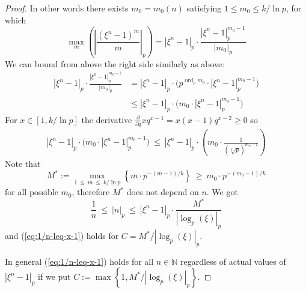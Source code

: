 \documentclass[10pt,a4paper]{amsart}
\def\N{{\mathbb N}}
\def\ln{\operatorname{ln}}
\def\ord{\operatorname{ord}}
\begin{document}
\begin{proof}
  In other words there exists $m_0 = m_0(n)$ satisfying $1 \leq m_0 \leq k/\ln p$, for which
  \begin{equation*} %
    \max_m \left( \left|\frac{(\xi^n - 1)^m}{m} \right|_p \right)
    = |\xi^n-1|_p \cdot \frac{\left| \xi^n-1 \right|_p^{m_0-1}}{|m_0|_p}
  \end{equation*}
  We can bound from above the right side similarly as above:
  \begin{align*}
    |\xi^n-1|_p \cdot \frac{\left| \xi^n-1 \right|_p^{m_0-1}}{|m_0|_p}
    &=  |\xi^n-1|_p \cdot \Big( p^{\ord_p m_0} \cdot \left| \xi^n-1 \right|_p^{m_0-1} \Big) \\
    &\leq |\xi^n-1|_p \cdot \Big( m_0 \cdot \left| \xi^n-1 \right|_p^{m_0-1} \Big)
  \end{align*}
  For $x \in [1, k/\ln p]$ the derivative $\frac{\partial}{\partial q} xq^{x-1} = x(x-1)q^{x-2} \geq 0$ so
  \begin{align*}
    |\xi^n-1|_p \cdot \Big( m_0 \cdot \left| \xi^n-1 \right|_p^{m_0-1} \Big)
    \ \leq \  |\xi^n-1|_p \cdot \left( m_0 \cdot \frac{1}{(\sqrt[k]{p})^{m_0-1}} \right)
  \end{align*}
  Note that
  \[
    M^* := \max_{1 \ \leq \ m \ \leq \ k/\ln p} \left\{ m \cdot p^{-(m-1)/k} \right\}
    \ \geq \ m_0 \cdot p^{-(m_0-1)/k}
  \]
  for all possible $m_0$, therefore $M^*$ does not depend on $n$. We got
  \[
    \frac{1}{n} \ \leq \ |n|_p \ \leq \ |\xi^n-1|_p \cdot \frac{M^*}{|\log_p(\xi)|_p}
  \]
  and (\ref{eq:1/n-leq-x-1}) holds for $C = M^* / |\log_p(\xi)|_p$.

  In general (\ref{eq:1/n-leq-x-1}) holds for all $n \in \N$ regardless of actual values of $|\xi^n-1|_p$
  if we put $C := \max \left\{1, M^* / |\log_p(\xi)|_p \right\}$.
\end{proof}
\end{document}
